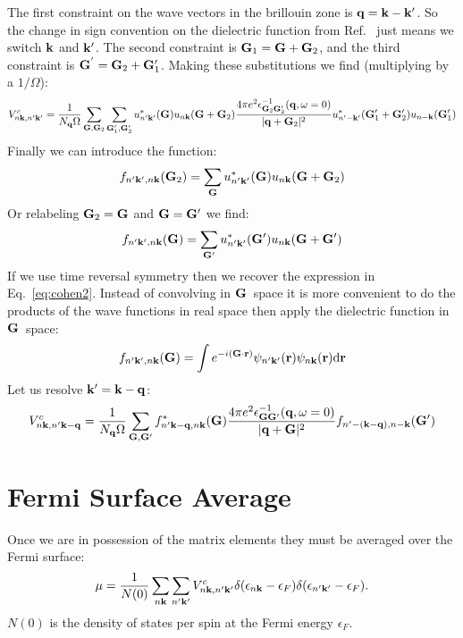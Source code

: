 The first constraint on the wave vectors in the brillouin zone is ${\bf q}={\bf k}-{\bf k}'$. So the change in sign convention
on the dielectric function from Ref.~\cite{cohen95} just means we switch ${\bf k}$ and ${\bf k}'$. The second
constraint is ${\bf G}_{1} = {\bf G} + {\bf G}_{2}$, and the third constraint is ${\bf G}^{'}={\bf G}_{2}+{\bf G}_{1}'$. Making
these substitutions we find (multiplying by a $1/\Omega$): 
%
\begin{equation}
V^{c}_{n{\bf k},n'{\bf k}'} = \frac{1}{N_{{\bf q}}\Omega}\sum_{{\bf G},{\bf G}_{2}}\sum_{{\bf G}_{1}',{\bf G}_{2}'} u^{*}_{n'{\bf k}'}({\bf G})u_{n{\bf k}}({\bf G}+{\bf G}_{2})
\frac{4\pi e^{2}\epsilon^{-1}_{{\bf G}_{2}{\bf G}_{2}'}({\bf q},\omega=0)}{|{\bf q}+{\bf G}_{2}|^{2}}u^{*}_{n'-{\bf k}'}({\bf G}_{1}'+{\bf G}_{2}')u_{n-{\bf k}}({\bf G}_{1}')
\end{equation}
%
Finally we can introduce the function:
%
\begin{equation}
f_{n'{\bf k}',n{\bf k}}({\bf G}_{2})= \sum_{{\bf G}} u^{*}_{n'{\bf k}'}({\bf G})u_{n{\bf k}}({\bf G}+{\bf G}_{2})
\end{equation}
%
Or relabeling ${\bf G}_{2}={\bf G}$ and ${\bf G}={\bf G}'$ we find:
%
\begin{equation}
f_{n'{\bf k}',n{\bf k}}({\bf G})= \sum_{{\bf G}'} u^{*}_{n'{\bf k}'}({\bf G}')u_{n{\bf k}}({\bf G}+{\bf G}')
\end{equation}
%
If we use time reversal symmetry then we 
recover the expression in Eq.~\ref{eq:cohen2}.
Instead of convolving in ${\bf G}$~space it is more convenient to do the products of the
wave functions in real space then apply the dielectric function in ${\bf G}$~space:
%
\begin{equation}
f_{n'{\bf k}',n{\bf k}}({\bf G}) = \int e^{-i({\bf G}\cdot{\bf r})} \psi_{n'{\bf k}'}({\bf r})\psi_{n{\bf k}}({\bf r}) \rm{d}{\bf r}
\end{equation}
%
Let us resolve ${\bf k}'={\bf k}-{\bf q}$:
%
\begin{equation}
V^{c}_{n{\bf k},n'{\bf k}-{\bf q}} = \frac{1}{N_{{\bf q}}\Omega}\sum_{{\bf G},{\bf G}'}f^{*}_{n'{\bf k}-{\bf q},n{\bf k}}({\bf G})
\frac{4\pi e^{2}\epsilon^{-1}_{{\bf G}{\bf G}'}({\bf q},\omega=0)}{|{\bf q}+{\bf G}|^{2}}f_{n'-({\bf k}-{\bf q}),n-{\bf k}}({\bf G}')
\end{equation}
%
\section{Fermi Surface Average}
Once we are in possession of the matrix elements they must be averaged over the Fermi surface:
%
\begin{equation}
\mu = \frac{1}{N(0)} \sum_{n{\bf k}}\sum_{n'{\bf k}'}V^{c}_{n{\bf k},n'{\bf k}'}\delta(\epsilon_{n{\bf k}}-\epsilon_{F})\delta(\epsilon_{n'{\bf k}'}-\epsilon_{F}).
\end{equation}
%
$N(0)$ is the density of states per spin at the Fermi energy $\epsilon_{F}$.

